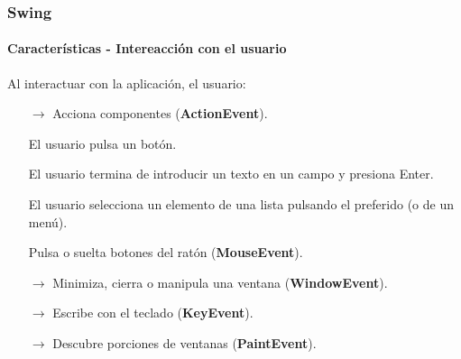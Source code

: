 \documentclass{beamer}
\begin{document}
{ %
    \begin{frame}[plain]
    \end{frame}
}

	\begin{frame}
		\frametitle{Swing}
		\framesubtitle{Caracter\'isticas - Intereacci\'on con el usuario}

        Al interactuar con la aplicaci\'on, el usuario:

	    \begin{itemize}
		    \item[$\rightarrow$] Acciona componentes (\textbf{ActionEvent}).
		    \item[] El usuario pulsa un bot\'on. 
		    \item[] El usuario termina de introducir un texto en un campo y presiona Enter. 
		    \item[] El usuario selecciona un elemento de una lista pulsando el preferido (o de un men\'u).
		    \item[] Pulsa o suelta botones del rat\'on (\textbf{MouseEvent}).
		    \item[$\rightarrow$] Minimiza, cierra o manipula una ventana (\textbf{WindowEvent}).
		    \item[$\rightarrow$] Escribe con el teclado (\textbf{KeyEvent}).
		    \item[$\rightarrow$] Descubre porciones de ventanas (\textbf{PaintEvent}).
        \end{itemize}
	\end{frame}	
\end{document}
